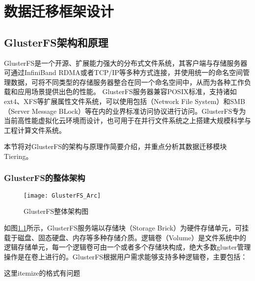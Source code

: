 \chapter{数据迁移框架设计}
\section{GlusterFS架构和原理}
GlusterFS\cite{GlusterFS}是一个开源、扩展能力强大的分布式文件系统，其客户端与存储服务器可通过InfiniBand RDMA或者TCP/IP等多种方式连接，并使用统一的命名空间管理数据，可将不同类型的存储服务器整合在同一个命名空间中，从而为各种工作负载和应用场景提供出色的性能。 GlusterFS服务器兼容POSIX标准，支持诸如ext4、XFS等{\color{orange}扩展属性文件系统}，可以使用包括（Network File System）和SMB（Server Message BLock）等在内的业界标准访问协议进行访问。GlusterFS专为当前高性能虚拟化云环境而设计，也可用于在并行文件系统之上搭建大规模科学与工程计算文件系统。 

本节将对GlusterFS的架构与原理作简要介绍，并重点分析其数据迁移模块Tiering。
\subsection{GlusterFS的整体架构}
\begin{figure}[htp]
\centering
\texttt{[image: GlusterFS\_Arc]}
\caption{GlusterFS整体架构图}
\label{fig:GlusterFS_Arc}
\end{figure}
如图\ref{fig:GlusterFS_Arc}所示，GlusterFS服务端以存储块（Storage Brick）为硬件存储单元，可挂载于磁盘、固态硬盘、内存等多种存储介质。逻辑卷（Volume）是文件系统中的逻辑存储单元，每一个逻辑卷可由一个或者多个存储块构成，绝大多数gluster管理操作是在卷上进行的。GlusterFS根据用户需求能够支持多种逻辑卷，主要包括：

{\color{red}这里itemize的格式有问题}

